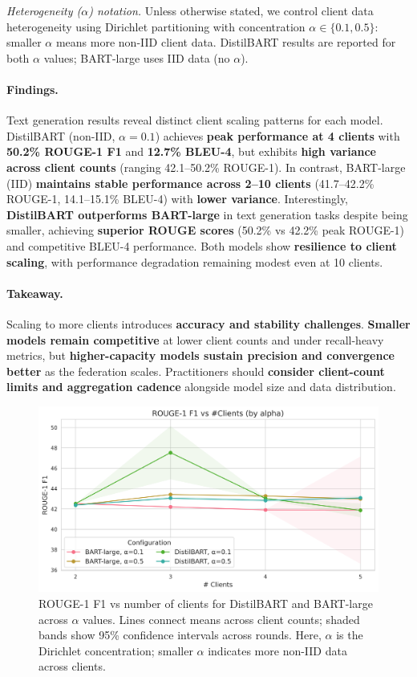 \documentclass[conference]{IEEEtran}
\begin{document}
\noindent\textit{Heterogeneity ($\alpha$) notation.} Unless otherwise stated, we control client data heterogeneity using Dirichlet partitioning with concentration $\alpha\in\{0.1, 0.5\}$: smaller $\alpha$ means more non-IID client data. DistilBART results are reported for both $\alpha$ values; BART-large uses IID data (no $\alpha$).

\paragraph{Findings.} Text generation results reveal distinct client scaling patterns for each model. DistilBART (non-IID, $\alpha{=}0.1$) achieves \textbf{peak performance at 4 clients} with \textbf{50.2\% ROUGE-1 F1} and \textbf{12.7\% BLEU-4}, but exhibits \textbf{high variance across client counts} (ranging 42.1--50.2\% ROUGE-1). In contrast, BART-large (IID) \textbf{maintains stable performance across 2--10 clients} (41.7--42.2\% ROUGE-1, 14.1--15.1\% BLEU-4) with \textbf{lower variance}. Interestingly, \textbf{DistilBART outperforms BART-large} in text generation tasks despite being smaller, achieving \textbf{superior ROUGE scores} (50.2\% vs 42.2\% peak ROUGE-1) and competitive BLEU-4 performance. Both models show \textbf{resilience to client scaling}, with performance degradation remaining modest even at 10 clients.

\paragraph{Takeaway.} Scaling to more clients introduces \textbf{accuracy and stability challenges}. \textbf{Smaller models remain competitive} at lower client counts and under recall-heavy metrics, but \textbf{higher-capacity models sustain precision and convergence better} as the federation scales. Practitioners should \textbf{consider client-count limits and aggregation cadence} alongside model size and data distribution.

\begin{figure}[t]
    \centering
    \includegraphics[width=\linewidth]{../plots/generation/rouge1_vs_clients_combined.png}
    \caption{ROUGE-1 F1 vs number of clients for DistilBART and BART-large across $\alpha$ values. Lines connect means across client counts; shaded bands show 95\% confidence intervals across rounds. Here, $\alpha$ is the Dirichlet concentration; smaller $\alpha$ indicates more non-IID data across clients.}
    \label{fig:rq2_clients}
\end{figure}
\end{document}
